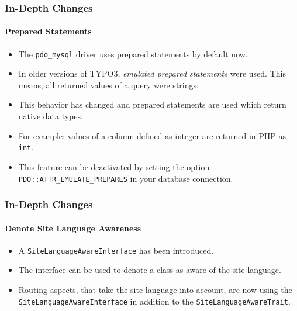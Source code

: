 \begin{frame}[fragile]
	\frametitle{In-Depth Changes}
	\framesubtitle{Prepared Statements}

	\lstset{basicstyle=\tiny\ttfamily}

	\begin{itemize}
		\item The \texttt{pdo\_mysql} driver uses prepared statements by default now.
		\item In older versions of TYPO3, \textit{emulated prepared statements} were used.
			This means, all returned values of a query were strings.
		\item This behavior has changed and prepared statements are used
			which return native data types.
		\item For example: values of a column defined as integer are returned in PHP as \texttt{int}.
		\item This feature can be deactivated by setting the option
			\texttt{PDO::ATTR\_EMULATE\_PREPARES} in your database connection.

	\end{itemize}

\end{frame}


\begin{frame}[fragile]
	\frametitle{In-Depth Changes}
	\framesubtitle{Denote Site Language Awareness}

	\lstset{basicstyle=\tiny\ttfamily}


	\begin{itemize}
		\item A \texttt{SiteLanguageAwareInterface} has been introduced.
		\item The interface can be used to denote a class as aware of the site language.
		\item Routing aspects, that take the site language into account,
			are now using the \texttt{SiteLanguageAwareInterface}
			in addition to the \texttt{SiteLanguageAwareTrait}.
	\end{itemize}

\end{frame}

